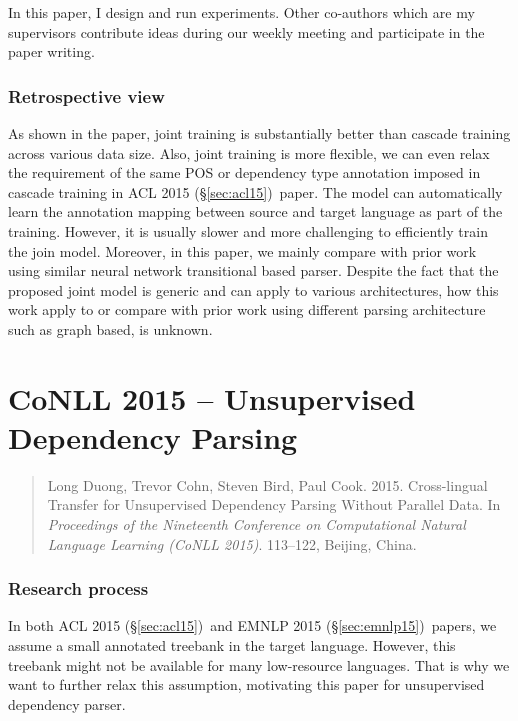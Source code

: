 \documentclass[12pt,twoside,final,hidelinks]{ltthesis}
\theoremstyle{definition}
\newcommand\aclv{ACL 2015 (\S\ref{sec:acl15})}
\newcommand\emnlpv{EMNLP 2015 (\S\ref{sec:emnlp15})}
\begin{document}
In this paper, I design and run experiments. Other co-authors which are my supervisors contribute ideas during our weekly 
meeting and participate in the paper writing. 

\subsubsection{Retrospective view}
As shown in the paper, joint training is substantially better than cascade training across various data size. Also, joint training is more flexible, we can 
even relax the requirement of the same POS or dependency type annotation imposed in cascade training in \aclv\ paper. The model can automatically learn the 
annotation mapping between source and target language as part of the training. However, it is usually slower and more challenging to efficiently train the 
join model. Moreover, in this paper, we mainly compare with prior work using similar neural network transitional based parser. Despite the fact that the 
proposed joint model is generic and can apply to various architectures, how this work apply to or compare  with prior work using different parsing 
architecture such as graph based, is unknown. 




\section{CoNLL 2015 --  Unsupervised Dependency Parsing}
\label{sec:conll15}
\begin{quote}
Long Duong, Trevor Cohn, Steven Bird, Paul Cook. 2015. Cross-lingual Transfer for Unsupervised Dependency Parsing Without Parallel Data. 
In \textit{Proceedings of the Nineteenth Conference on Computational Natural Language Learning (CoNLL 2015)}. 113--122, Beijing, China. 
\end{quote}

\subsubsection{Research process}
In both \aclv\ and \emnlpv\ papers, we assume a small annotated treebank in the target language. However, this treebank might not be available for 
many low-resource languages. That is why we want to further relax this assumption, motivating this paper for unsupervised dependency parser. 
\end{document}
